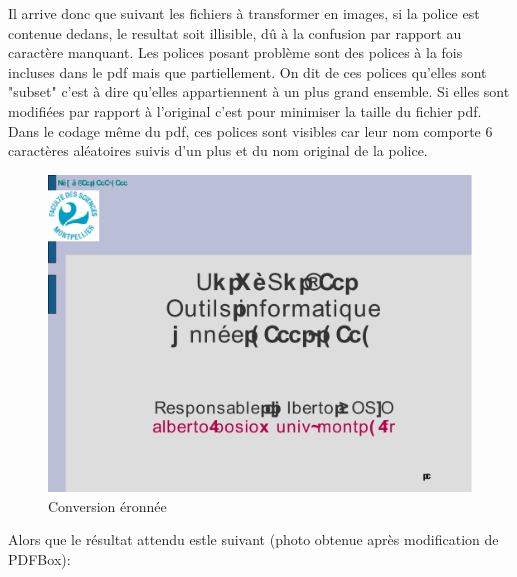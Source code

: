 Il arrive donc que suivant les fichiers à transformer en images, si la police 
est contenue dedans, le resultat soit illisible, dû à la confusion par rapport
au caractère manquant. 
Les polices posant problème sont des polices à la fois incluses dans le pdf mais que
partiellement. On dit de ces polices qu'elles sont "subset" c'est à dire qu'elles appartiennent
à un plus grand ensemble. Si elles sont modifiées par rapport à l'original c'est pour
minimiser la taille du fichier pdf. Dans le codage même du pdf, ces polices sont visibles 
car leur nom comporte 6 caractères aléatoires suivis d'un plus et du nom original 
de la police.
    \begin{figure}[h]
        \begin{center}
            \includegraphics[scale=0.2]{images/GLSE301_2011-2012_seance_11_badConv.jpg} 
        \end{center}

        \caption{Conversion éronnée}
        \label{Conversion éronnée}
    \end{figure}


Alors que le résultat attendu estle suivant (photo obtenue après modification de
PDFBox):


